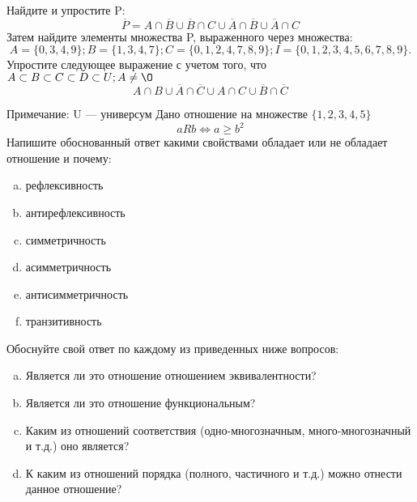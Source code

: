 \documentclass[10pt]{exam}
\begin{document}
\begin{questions}
\question
Найдите и упростите P:
\begin{equation*}
\overline{P} = A \cap \overline{B} \cup \overline{B} \cap C \cup \overline{A} \cap \overline{B} \cup \overline{A} \cap C
\end{equation*}
Затем найдите элементы множества P, выраженного через множества:
\begin{equation*}
A = \{0, 3, 4, 9\}; 
B = \{1, 3, 4, 7\};
C = \{0, 1, 2, 4, 7, 8, 9\};
I = \{0, 1, 2, 3, 4, 5, 6, 7, 8, 9\}.
\end{equation*}\question
Упростите следующее выражение с учетом того, что $A\subset B \subset C \subset D \subset U; A \neq \O$
\begin{equation*}
A \cap B \cup \overline{A} \cap \overline{C} \cup A \cap C \cup \overline{B} \cap \overline{C}
\end{equation*}

Примечание: U — универсум\question
Дано отношение на множестве $\{1, 2, 3, 4, 5\}$ 
\begin{equation*}
aRb \iff a \geq b^2
\end{equation*}
Напишите обоснованный ответ какими свойствами обладает или не обладает отношение и почему:   
\begin{enumerate} [a)]\setcounter{enumi}{0}
\item рефлексивность
\item антирефлексивность
\item симметричность
\item асимметричность
\item антисимметричность
\item транзитивность
\end{enumerate}

Обоснуйте свой ответ по каждому из приведенных ниже вопросов:
\begin{enumerate} [a)]\setcounter{enumi}{0}
    \item Является ли это отношение отношением эквивалентности?
    \item Является ли это отношение функциональным?
    \item Каким из отношений соответствия (одно-многозначным, много-многозначный и т.д.) оно является?
    \item К каким из отношений порядка (полного, частичного и т.д.) можно отнести данное отношение?
\end{enumerate}



\end{questions}
\end{document}
